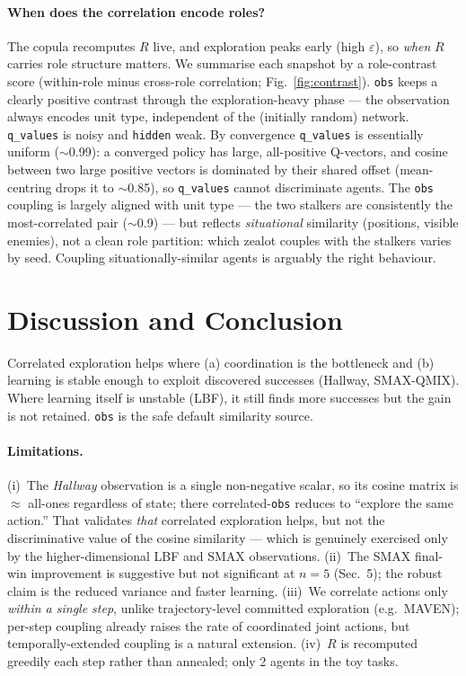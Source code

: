 \documentclass[10pt,twocolumn]{article}
\newcommand{\eps}{\varepsilon}
\newcommand{\obs}{\texttt{obs}}
\newcommand{\qv}{\texttt{q\_values}}
\newcommand{\hid}{\texttt{hidden}}
\begin{document}
\paragraph{When does the correlation encode roles?} The copula recomputes $R$
live, and exploration peaks early (high $\eps$), so \emph{when} $R$ carries role
structure matters. We summarise each snapshot by a role-contrast score
(within-role minus cross-role correlation; Fig.~\ref{fig:contrast}). \obs{} keeps
a clearly positive contrast through the exploration-heavy phase --- the
observation always encodes unit type, independent of the (initially random)
network. \qv{} is noisy and \hid{} weak. By convergence \qv{} is essentially
uniform ($\sim$0.99): a converged policy has large, all-positive Q-vectors, and
cosine between two large positive vectors is dominated by their shared offset
(mean-centring drops it to $\sim$0.85), so \qv{} cannot discriminate agents.
The \obs{} coupling is largely aligned with unit type --- the two stalkers are
consistently the most-correlated pair ($\sim$0.9) --- but reflects
\emph{situational} similarity (positions, visible enemies), not a clean role
partition: which zealot couples with the stalkers varies by seed. Coupling
situationally-similar agents is arguably the right behaviour.

\section{Discussion and Conclusion}
Correlated exploration helps where (a) coordination is the bottleneck and (b)
learning is stable enough to exploit discovered successes (Hallway, SMAX-QMIX).
Where learning itself is unstable (LBF), it still finds more successes but the
gain is not retained. \obs{} is the safe default similarity source.

\paragraph{Limitations.} (i)~The \emph{Hallway} observation is a single
non-negative scalar, so its cosine matrix is $\approx$ all-ones regardless of
state; there correlated-\obs{} reduces to ``explore the same action.'' That
validates \emph{that} correlated exploration helps, but not the discriminative
value of the cosine similarity --- which is genuinely exercised only by the
higher-dimensional LBF and SMAX observations. (ii)~The SMAX final-win
improvement is suggestive but not significant at $n{=}5$ (Sec.~5); the robust
claim is the reduced variance and faster learning. (iii)~We correlate actions
only \emph{within a single step}, unlike trajectory-level committed exploration
(e.g.\ MAVEN); per-step coupling already raises the rate of coordinated joint
actions, but temporally-extended coupling is a natural extension. (iv)~$R$ is
recomputed greedily each step rather than annealed; only 2 agents in the toy
tasks.
\end{document}
